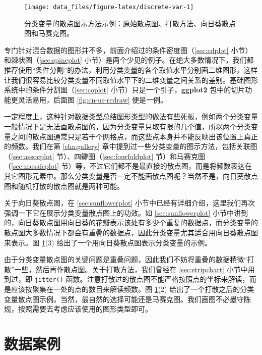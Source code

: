 \documentclass[
  b5paper,
  UTF8,twoside]{book}
\begin{document}
\begin{figure}

{\centering \texttt{[image: data\_files/figure-latex/discrete-var-1]} 

}

\caption[分类变量的散点图示方法示例]{分类变量的散点图示方法示例：原始散点图、打散方法、向日葵散点图和马赛克图。}\label{fig:discrete-var}
\end{figure}



专门针对混合数据的图形并不多，前面介绍过的条件密度图（\ref{sec:cdplot} 小节）和棘状图（\ref{sec:spineplot} 小节）是两个少见的例子。在绝大多数情况下，我们都推荐使用``条件分割''的办法，利用分类变量的各个取值水平分别画二维图形，这样让我们很容易比较分类变量不同取值水平下的二维变量之间关系的差别。基础图形系统中的条件分割图（\ref{sec:coplot} 小节）只是一个引子，\textbf{ggplot2} 包中的切片功能更灵活易用，后面图 \ref{fig:cn-us-redraw} 便是一例。

一定程度上，这种针对数据类型总结图形类型的做法有些死板，例如两个分类变量一般情况下是无法画散点图的，因为分类变量只取有限的几个值，所以两个分类变量之间的散点图通常只是若干个网格点，而这些点本身并不能反映出该位置上真正的频数。我们在第 \ref{cha:gallery} 章中提到过一些分类变量的图示方法，包括关联图（\ref{sec:assocplot} 节）、四瓣图（\ref{sec:fourfoldplot} 节）和马赛克图（\ref{sec:mosaicplot} 节）等，不过它们都不是最直接的散点图，而是将频数表达在其它图形元素中。那么分类变量是否一定不能画散点图呢？当然不是，向日葵散点图和随机打散的散点图就是两种可能。

关于向日葵散点图，在 \ref{sec:sunflowerplot} 小节中已经有详细介绍，这里我们再次强调一下它在展示分类变量散点图上的功效。如 \ref{sec:sunflowerplot} 小节中讲到的，向日葵散点图用向日葵的花瓣表示该处有多少个重复的数据点，而分类变量的散点图大多数情况下都会有重叠的数据点，因此分类变量尤其适合用向日葵散点图来表示。图 \ref{fig:discrete-var}(3) 给出了一个用向日葵散点图表示分类变量的示例。

由于分类变量散点图的关键问题是重叠问题，因此我们不妨将重叠的数据稍微``打散''一些，然后再作散点图。关于打散方法，我们曾经在 \ref{sec:stripchart} 小节中用到过，即 \texttt{jitter()} 函数。注意打散过的散点图不能严格按照点的坐标来解读，而是应该按聚集在一处的点的数目来解读频数。图 \ref{fig:discrete-var}(2) 给出了一个打散之后的分类变量散点图示例。当然，最自然的选择可能还是马赛克图。我们画图不必墨守陈规，按照需要去考虑应该使用的图形类型即可。

\hypertarget{sec:data-case}{%
\section{数据案例}\label{sec:data-case}}
\end{document}
